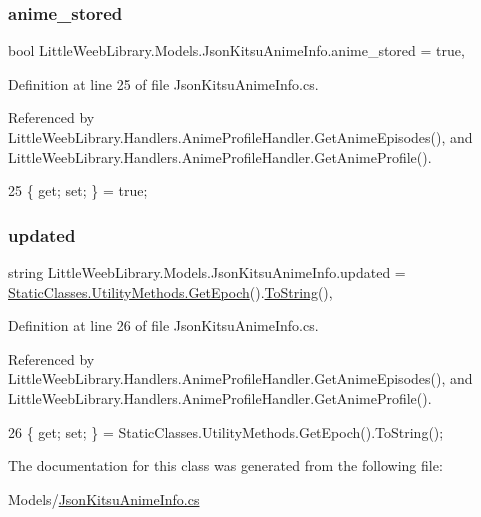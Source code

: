 \subsubsection{\texorpdfstring{anime\+\_\+stored}{anime\_stored}}
{\footnotesize\ttfamily bool Little\+Weeb\+Library.\+Models.\+Json\+Kitsu\+Anime\+Info.\+anime\+\_\+stored = true\hspace{0.3cm}{\ttfamily [get]}, {\ttfamily [set]}}



Definition at line 25 of file Json\+Kitsu\+Anime\+Info.\+cs.



Referenced by Little\+Weeb\+Library.\+Handlers.\+Anime\+Profile\+Handler.\+Get\+Anime\+Episodes(), and Little\+Weeb\+Library.\+Handlers.\+Anime\+Profile\+Handler.\+Get\+Anime\+Profile().


\begin{DoxyCode}
25 \{ \textcolor{keyword}{get}; \textcolor{keyword}{set}; \} = \textcolor{keyword}{true};
\end{DoxyCode}
\mbox{\label{class_little_weeb_library_1_1_models_1_1_json_kitsu_anime_info_afc1bfd4e16df7491b9e7ae7380641938}} 
\subsubsection{\texorpdfstring{updated}{updated}}
{\footnotesize\ttfamily string Little\+Weeb\+Library.\+Models.\+Json\+Kitsu\+Anime\+Info.\+updated = \mbox{\hyperlink{class_little_weeb_library_1_1_static_classes_1_1_utility_methods_a12336d9e64983ddabaad8950486fafb2}{Static\+Classes.\+Utility\+Methods.\+Get\+Epoch}}().\mbox{\hyperlink{class_little_weeb_library_1_1_models_1_1_json_kitsu_anime_info_a869f64c42523b48911549a2f3fffffa7}{To\+String}}()\hspace{0.3cm}{\ttfamily [get]}, {\ttfamily [set]}}



Definition at line 26 of file Json\+Kitsu\+Anime\+Info.\+cs.



Referenced by Little\+Weeb\+Library.\+Handlers.\+Anime\+Profile\+Handler.\+Get\+Anime\+Episodes(), and Little\+Weeb\+Library.\+Handlers.\+Anime\+Profile\+Handler.\+Get\+Anime\+Profile().


\begin{DoxyCode}
26 \{ \textcolor{keyword}{get}; \textcolor{keyword}{set}; \} = StaticClasses.UtilityMethods.GetEpoch().ToString();
\end{DoxyCode}


The documentation for this class was generated from the following file\+:\begin{DoxyCompactItemize}
\item 
Models/\mbox{\hyperlink{_json_kitsu_anime_info_8cs}{Json\+Kitsu\+Anime\+Info.\+cs}}\end{DoxyCompactItemize}

